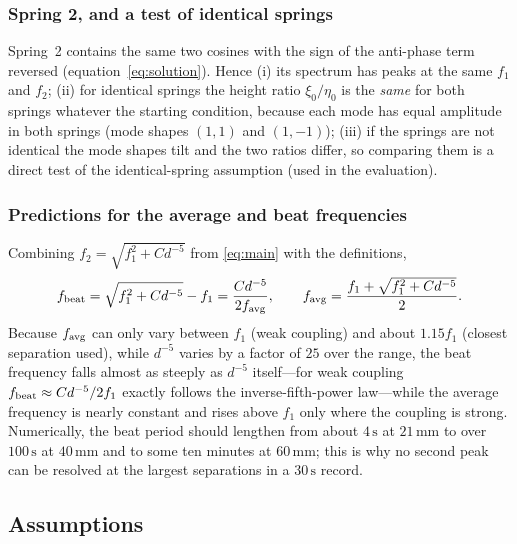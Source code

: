 \documentclass[11pt,a4paper]{article}
\newcommand{\un}[1]{\,\mathrm{#1}}
\begin{document}
\subsubsection{Spring 2, and a test of identical springs}

Spring~2 contains the same two cosines with the sign of the anti-phase term reversed (equation~\eqref{eq:solution}). Hence (i) its spectrum has peaks at the same $f_1$ and $f_2$; (ii) for identical springs the height ratio $\xi_0/\eta_0$ is the \emph{same} for both springs whatever the starting condition, because each mode has equal amplitude in both springs (mode shapes $(1,1)$ and $(1,-1)$); (iii) if the springs are not identical the mode shapes tilt and the two ratios differ, so comparing them is a direct test of the identical-spring assumption (used in the evaluation).

\subsubsection{Predictions for the average and beat frequencies}

Combining $f_2=\sqrt{f_1^2+Cd^{-5}}$ from \eqref{eq:main} with the definitions,
\begin{equation}
f_{\rm beat}=\sqrt{f_1^2+Cd^{-5}}-f_1=\frac{Cd^{-5}}{2f_{\rm avg}},\qquad
f_{\rm avg}=\frac{f_1+\sqrt{f_1^2+Cd^{-5}}}{2}.
\label{eq:favg_fbeat}
\end{equation}
Because $f_{\rm avg}$ can only vary between $f_1$ (weak coupling) and about $1.15f_1$ (closest separation used), while $d^{-5}$ varies by a factor of $25$ over the range, the beat frequency falls almost as steeply as $d^{-5}$ itself---for weak coupling $f_{\rm beat}\approx Cd^{-5}/2f_1$ exactly follows the inverse-fifth-power law---while the average frequency is nearly constant and rises above $f_1$ only where the coupling is strong. Numerically, the beat period should lengthen from about $4\un{s}$ at $21\un{mm}$ to over $100\un{s}$ at $40\un{mm}$ and to some ten minutes at $60\un{mm}$; this is why no second peak can be resolved at the largest separations in a $30\un{s}$ record.

\subsection{Assumptions}\label{sec:assumptions}
\end{document}
